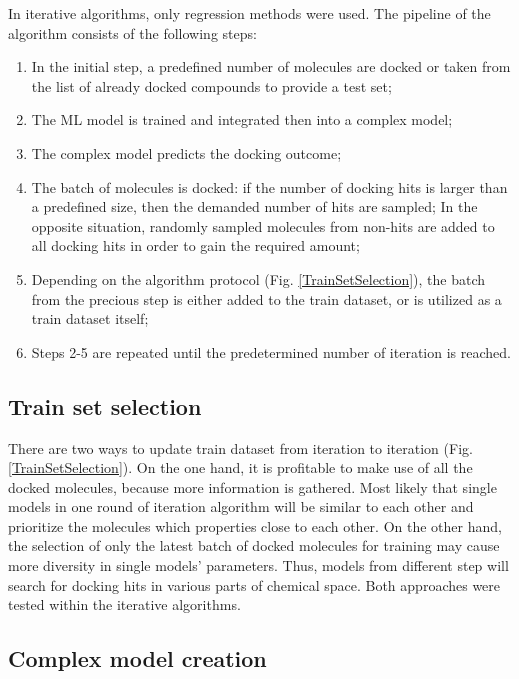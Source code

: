 In iterative algorithms, only regression methods were used.
The pipeline of the algorithm consists of the following steps:
\begin{enumerate}
    \item In the initial step, a predefined number of molecules are docked or taken from the list of already docked compounds to provide a test set;
    \item The ML model is trained and integrated then into a complex model;
    \item The complex model predicts the docking outcome;
    \item The batch of molecules is docked: if the number of docking hits is larger than a predefined size, then the demanded number of hits are sampled;
    In the opposite situation, randomly sampled molecules from non-hits are added to all docking hits in order to gain the required amount;
    \item Depending on the algorithm protocol (Fig. \ref{TrainSetSelection}), the batch from the precious step is either added to the train dataset, or is utilized as a train dataset itself;
    \item Steps 2-5 are repeated until the predetermined number of iteration is reached.
\end{enumerate}

\subsection{Train set selection}
There are two ways to update train dataset from iteration to iteration (Fig. \ref{TrainSetSelection}).
On the one hand, it is profitable to make use of all the docked molecules, because more information is gathered.
Most likely that single models in one round of iteration algorithm will be similar to each other and prioritize the molecules which properties close to each other.
On the other hand, the selection of only the latest batch of docked molecules for training may cause more diversity in single models' parameters.
Thus, models from different step will search for docking hits in various parts of chemical space.
Both approaches were tested within the iterative algorithms.\\

\subsection{Complex model creation}


